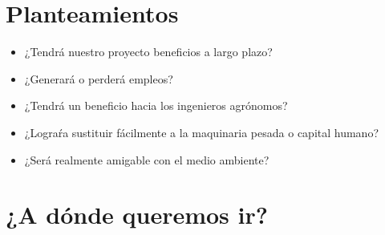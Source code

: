 \documentclass[11pt,a4paper]{article}
\begin{document}
\section{Planteamientos}

\begin{itemize}

\item ¿Tendrá nuestro proyecto beneficios a largo plazo?\\
\item ¿Generará o perderá empleos?\\
\item ¿Tendrá un beneficio hacia los ingenieros agrónomos?\\
\item ¿Lograŕa sustituir fácilmente a la maquinaria pesada o capital humano?\\
\item ¿Será realmente amigable con el medio ambiente?\\
\end{itemize} 

\section{¿A dónde queremos ir?}
\end{document}
